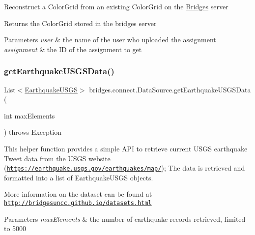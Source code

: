Reconstruct a Color\+Grid from an existing Color\+Grid on the \hyperlink{classbridges_1_1connect_1_1_bridges}{Bridges} server

\begin{DoxyReturn}{Returns}
the Color\+Grid stored in the bridges server 
\end{DoxyReturn}

\begin{DoxyParams}{Parameters}
{\em user} & the name of the user who uploaded the assignment \\
\hline
{\em assignment} & the ID of the assignment to get \\
\hline
\end{DoxyParams}
\mbox{\label{classbridges_1_1connect_1_1_data_source_a96f3bb21fc1557dd2c6466dce6a30e7f}} 
\subsubsection{\texorpdfstring{get\+Earthquake\+U\+S\+G\+S\+Data()}{getEarthquakeUSGSData()}}
{\footnotesize\ttfamily List$<$\hyperlink{classbridges_1_1data__src__dependent_1_1_earthquake_u_s_g_s}{Earthquake\+U\+S\+GS}$>$ bridges.\+connect.\+Data\+Source.\+get\+Earthquake\+U\+S\+G\+S\+Data (\begin{DoxyParamCaption}\item[{int}]{max\+Elements }\end{DoxyParamCaption}) throws Exception}

This helper function provides a simple A\+PI to retrieve current U\+S\+GS earthquake Tweet data from the U\+S\+GS website (\href{https://earthquake.usgs.gov/earthquakes/map/}{\tt https\+://earthquake.\+usgs.\+gov/earthquakes/map/}); The data is retrieved and formatted into a list of Earthquake\+U\+S\+GS objects.

More information on the dataset can be found at \href{http://bridgesuncc.github.io/datasets.html}{\tt http\+://bridgesuncc.\+github.\+io/datasets.\+html}


\begin{DoxyParams}{Parameters}
{\em max\+Elements} & the number of earthquake records retrieved, limited to 5000 \\
\hline
\end{DoxyParams}

